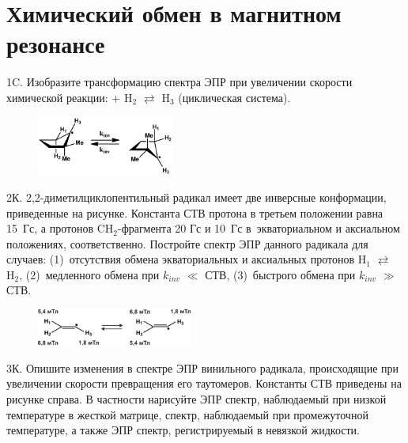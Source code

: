 \setmainfont{Noto Serif}
\setsansfont{Noto Sans}
\setmonofont{Noto Sans Mono}

\section{Химический обмен в магнитном резонансе}
1C. Изобразите трансформацию спектра ЭПР при увеличении скорости химической реакции: 
 + $\text{H}_2$ $\rightleftarrows$ $\text{H}_3$ (циклическая система).
\par
\begin{figure} %
    \centering
    \vspace{-0mm}
    \includegraphics[width=45mm]{images/Fig_2_8_2.png}
    \vspace{-4mm}
\end{figure}
2К. 2,2-диметилциклопентильный радикал имеет две инверсные конформации, приведенные на рисунке. Константа СТВ протона в третьем положении равна 15~Гс, а протонов $\text{CH}_2$-фрагмента 20 Гс и 10~Гс в~экваториальном и аксиальном положениях, соответственно. Постройте спектр ЭПР данного радикала для случаев: (1)~отсутствия обмена экваториальных и аксиальных протонов $\text{H}_1$ $\rightleftarrows$ $\text{H}_2$, (2)~медленного обмена при $k_{inv}$ $\ll$ СТВ, (3)~быстрого обмена при $k_{inv}$ $\gg$ СТВ.
\par
\begin{figure} %
    \centering
    \vspace{-0mm}
    \includegraphics[width=51mm]{images/Fig_2_8_4.png}
    \vspace{-4mm}
\end{figure}
3К. Опишите изменения в спектре ЭПР винильного радикала, происходящие при увеличении скорости превращения его таутомеров. Константы СТВ приведены на рисунке справа. В частности нарисуйте ЭПР спектр, наблюдаемый при низкой температуре в жесткой матрице, спектр, наблюдаемый при промежуточной температуре, а также ЭПР спектр, регистрируемый в невязкой жидкости.
\par
